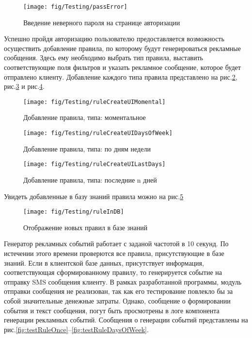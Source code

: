 \begin{figure}[h]
	\centering
	\texttt{[image: fig/Testing/passError]}
	\caption{Введение неверного пароля на странице авторизации}
	\label{fig:passError}
\end{figure}

Успешно пройдя авторизацию пользователю предоставляется возможность осуществить добавление правила, по которому будут генерироваться рекламные сообщения. Здесь ему необходимо выбрать тип правила, выставить соответствующие поля фильтров и указать рекламное сообщение, которое будет отправлено клиенту. Добавление каждого типа правила представлено на рис.\ref{fig:ruleCreateUIMomental}, рис.\ref{fig:ruleCreateUIDaysOfWeek} и рис.\ref{fig:ruleCreateUILastDays}.

\begin{figure}[h]
	\centering
	\texttt{[image: fig/Testing/ruleCreateUIMomental]}
	\caption{Добавление правила, типа: моментальное}
	\label{fig:ruleCreateUIMomental}
\end{figure}

\begin{figure}[h]
	\centering
	\texttt{[image: fig/Testing/ruleCreateUIDaysOfWeek]}
	\caption{Добавление правила, типа: по дням недели}
	\label{fig:ruleCreateUIDaysOfWeek}
\end{figure}

\begin{figure}[h]
	\centering
	\texttt{[image: fig/Testing/ruleCreateUILastDays]}
	\caption{Добавление правила, типа: последние n дней}
	\label{fig:ruleCreateUILastDays}
\end{figure}

Увидеть добавленные в базу знаний правила можно на рис.\ref{fig:ruleInDB}

\begin{figure}[h]
	\centering
	\texttt{[image: fig/Testing/ruleInDB]}
	\caption{Отображение новых правил в базе знаний}
	\label{fig:ruleInDB}
\end{figure}

Генератор рекламных событий работает с заданой частотой в 10 секунд. По истечении этого времени проверются все правила, присутствующие в базе знаний. Если в клиентской базе данных, присутствует информация, соответствующая сформированному правилу, то генерируется событие на отправку SMS сообщения клиенту. В рамках разработанной программы, модуль отправки сообщения не реализован, так как его тестирование повлекло бы за собой значительные денежные затраты. Однако, сообщение о формировании события и текст сообщения, погут быть просмотрены в логе компонента генерации рекламных событий. Сообщения о генерации событий представлены на рис.\ref{fig:testRuleOnce}--\ref{fig:testRuleDaysOfWeek}.

